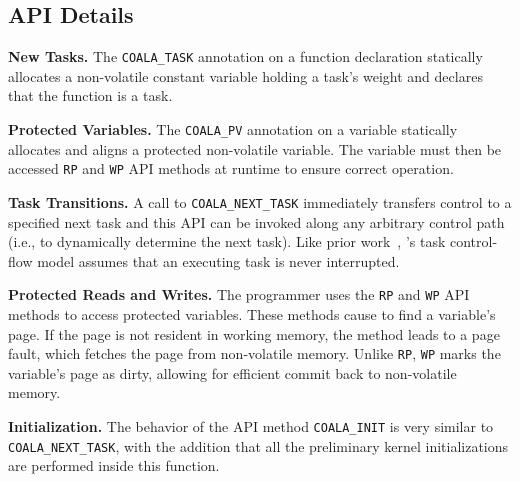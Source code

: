\subsection{API Details}

\textbf{New Tasks.} The \texttt{COALA\_TASK} annotation on a function
declaration statically allocates a non-volatile constant variable holding a
task's weight and declares that the function is a task.

\textbf{Protected Variables.} The \texttt{COALA\_PV} annotation on a
variable statically allocates and aligns a protected non-volatile variable. The
variable must then be accessed \texttt{RP} and \texttt{WP} API methods at
runtime to ensure correct operation.

\textbf{Task Transitions.} A call to \texttt{COALA\_NEXT\_TASK} immediately
transfers control to a specified next task and this API can be invoked along
any arbitrary control path (i.e., to dynamically determine the next task).
Like prior work~\cite{chain,dino,ratchet}, \sys's task control-flow model
assumes that an executing task is never interrupted. 

\textbf{Protected Reads and Writes.} The programmer uses the \texttt{RP} and \texttt{WP} API
methods to access protected variables.  These methods cause \sys to find a variable's page.
If the page is not resident in working memory, the method leads to a page fault,
which fetches the page from non-volatile memory. Unlike \texttt{RP},
\texttt{WP} marks the variable's page as dirty, allowing for efficient 
commit back to non-volatile memory. 

\textbf{Initialization.} The behavior of the API method
\texttt{COALA\_INIT} is very similar to \texttt{COALA\_NEXT\_TASK}, with the
addition that all the preliminary kernel initializations are performed inside
this function. 



